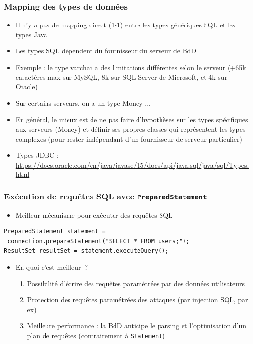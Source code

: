 \documentclass[aspectratio=169,10pt]{beamer}
\begin{document}
\begin{frame}
	\frametitle{Mapping des types de données}
	\begin{itemize}
		\item Il n'y a pas de mapping direct (1-1) entre les types génériques SQL et les types Java
		\item Les types SQL dépendent du fournisseur du serveur de BdD
		\item Exemple : le type varchar a des limitations différentes selon le serveur
		 (+65k caractères max sur MySQL, 8k sur SQL Server de Microsoft, et 4k sur Oracle)
		\item Sur certains serveurs, on a un type Money ...
		\item En général, le mieux est de ne pas faire d'hypothèses sur les types spécifiques aux serveurs (Money) et définir ses propres classes qui représentent les types complexes (pour rester indépendant d'un fournisseur de serveur particulier)
		\item Types JDBC :
		{\tiny \url{https://docs.oracle.com/en/java/javase/15/docs/api/java.sql/java/sql/Types.html}}
	\end{itemize}
\end{frame}

\begin{frame}[fragile]
\frametitle{Exécution de requêtes SQL avec \texttt{PreparedStatement}}
	\begin{itemize}
						
		\item Meilleur mécanisme pour exécuter des requêtes SQL
	\end{itemize}
\begin{lstlisting}
PreparedStatement statement = 
 connection.prepareStatement("SELECT * FROM users;");
ResultSet resultSet = statement.executeQuery();
\end{lstlisting}
	\begin{itemize}
\item En quoi c'est meilleur~?
\begin{enumerate}
	\item Possibilité d'écrire des requêtes paramétrées par des données utilisateurs
	\item Protection des requêtes paramétrées des attaques (par injection SQL, par ex)
	\item Meilleure performance : la BdD anticipe le parsing et l'optimisation d'un plan de requêtes (contrairement à \texttt{Statement})
\end{enumerate}
	\end{itemize}
\end{frame}
\end{document}
